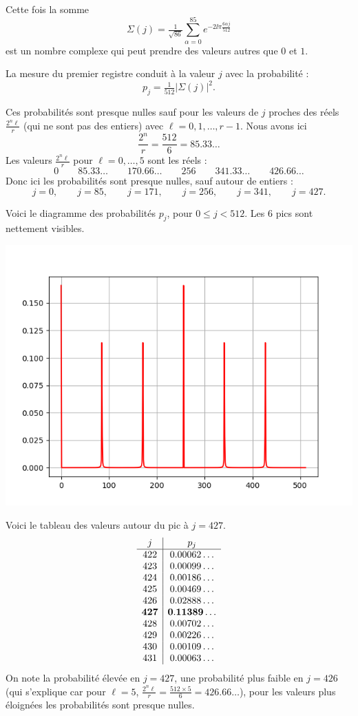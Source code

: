 \documentclass[11pt,class=report,crop=false]{standalone}
\begin{document}
Cette fois la somme 
$$\Sigma(j) = \tfrac{1}{\sqrt{86}}
     \sum_{\alpha=0}^{85} 
     e^{-2\ii \pi \frac{6\alpha j}{512}}$$
est un nombre complexe qui peut prendre des valeurs autres que $0$ et $1$.

La mesure du premier registre conduit à la valeur $j$ avec la probabilité :
$$p_j = \tfrac{1}{512} |\Sigma(j)|^2.$$

Ces probabilités sont presque nulles sauf pour les valeurs de $j$ proches des réels
$\frac{2^n\ell}{r}$ (qui ne sont pas des entiers) avec $\ell=0,1,\ldots,r-1$.
Nous avons ici 
$$\frac{2^n}{r} = \frac{512}{6} = 85.33\ldots$$
Les valeurs $\frac{2^n\ell}{r}$ pour $\ell=0,\ldots,5$ sont les réels :
$$0 \qquad 85.33\ldots \qquad 170.66\ldots \qquad 256 \qquad 341.33\ldots \qquad 426.66\ldots$$
Donc ici les probabilités sont presque nulles, sauf autour de entiers :
$$j=0,\qquad j=85,\qquad j=171,\qquad j=256,\qquad j=341,\qquad j=427.$$

Voici le diagramme des probabilités $p_j$, pour $0 \le j < 512$. Les $6$ pics sont nettement visibles.
\begin{center}
   \includegraphics[scale=\myscale,scale=0.8]{figures/shor}
\end{center}
	
Voici le tableau des valeurs autour du pic à $j=427$.
$$\begin{array}{c|c}
j & p_j \\ \hline
422 &  0.00062\ldots \\
423 &  0.00099\ldots \\
424 &  0.00186\ldots \\
425 &  0.00469\ldots \\
426 &  0.02888\ldots \\
{\bf 427} &  {\bf 0.11389\ldots} \\
428 &  0.00702\ldots \\
429 &  0.00226\ldots \\
430 &  0.00109\ldots \\
431 &  0.00063\ldots \\
\end{array}
$$
On note la probabilité élevée en $j=427$, une probabilité plus faible en $j=426$
(qui s'explique car pour $\ell=5$, $\frac{2^n\ell}{r} = \frac{512\times5}{6} = 426.66\ldots$), pour les valeurs plus éloignées les probabilités sont presque nulles.
\end{document}
